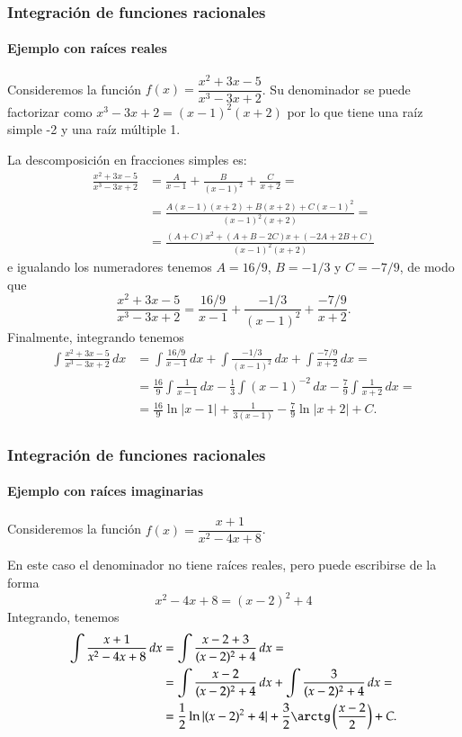 \begin{frame}[allowframebreaks]
	\frametitle{Integración de funciones racionales}
	\framesubtitle{Ejemplo con raíces reales}
	Consideremos la función $f(x)=\dfrac{x^2+3x-5}{x^3-3x+2}$. Su denominador se puede factorizar como $x^3-3x+2=(x-1)^2(x+2)$ por lo que tiene una raíz simple -2 y una raíz múltiple 1.
	
	La descomposición en fracciones simples es:
	\begin{align*}
		\frac{x^2+3x-5}{x^3-3x+2} & =\frac{A}{x-1}+\frac{B}{(x-1)^2}+\frac{C}{x+2} = \\ &= \frac{A(x-1)(x+2)+ B(x+2)+C(x-1)^2}{(x-1)^2(x+2)} = \\ &= \frac{(A+C)x^2+(A+B-2C)x+(-2A+2B+C)}{(x-1)^2(x+2)}
	\end{align*}
	e igualando los numeradores tenemos $A=16/9$, $B=-1/3$ y $C=-7/9$, de modo que
	\[
		\frac{x^2+3x-5}{x^3-3x+2}= \frac{16/9}{x-1}+\frac{-1/3}{(x-1)^2}+\frac{-7/9}{x+2}.
	\]
	Finalmente, integrando tenemos
	\begin{align*}
		\int \frac{x^2+3x-5}{x^3-3x+2}\, dx & = \int \frac{16/9}{x-1}\,dx+\int \frac{-1/3}{(x-1)^2}\,dx+\int \frac{-7/9}{x+2}\,dx = \\ &=
		\frac{16}{9}\int\frac{1}{x-1}\,dx-\frac{1}{3}\int(x-1)^{-2}\,dx- \frac{7}{9}\int \frac{1}{x+2}\,dx = \\
		&= \frac{16}{9}\ln|x-1|+\frac{1}{3(x-1)}-\frac{7}{9}\ln|x+2|+C.
	\end{align*}
\end{frame}


\begin{frame}
	\frametitle{Integración de funciones racionales}
	\framesubtitle{Ejemplo con raíces imaginarias}
	Consideremos la función $f(x)=\dfrac{x+1}{x^2-4x+8}$. 
	
	En este caso el denominador no tiene raíces reales, pero puede escribirse de la forma
	\[
		x^2-4x+8 = (x-2)^2+4
	\]
	Integrando, tenemos
	\begin{align*}
		\int \dfrac{x+1}{x^2-4x+8}\, dx & = \int \dfrac{x-2+3}{(x-2)^2+4}\,dx =                                         \\
		                                & = \int \dfrac{x-2}{(x-2)^2+4}\,dx + \int \dfrac{3}{(x-2)^2+4}\,dx =           \\
		                                & = \frac{1}{2}\ln|(x-2)^2+4| + \dfrac{3}{2}\arctg\left(\frac{x-2}{2}\right)+C. 
	\end{align*}
\end{frame}


